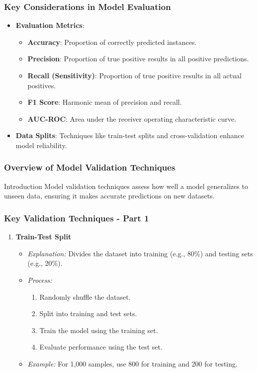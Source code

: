 \documentclass[aspectratio=169]{beamer}
\begin{document}
\begin{frame}[fragile]
    \frametitle{Key Considerations in Model Evaluation}
    \begin{itemize}
        \item \textbf{Evaluation Metrics}:
            \begin{itemize}
                \item \textbf{Accuracy}: Proportion of correctly predicted instances.
                \item \textbf{Precision}: Proportion of true positive results in all positive predictions.
                \item \textbf{Recall (Sensitivity)}: Proportion of true positive results in all actual positives.
                \item \textbf{F1 Score}: Harmonic mean of precision and recall.
                \item \textbf{AUC-ROC}: Area under the receiver operating characteristic curve.
            \end{itemize}
        \item \textbf{Data Splits}: Techniques like train-test splits and cross-validation enhance model reliability.
    \end{itemize}
\end{frame}

\begin{frame}[fragile]
    \frametitle{Overview of Model Validation Techniques}
    \begin{block}{Introduction}
        Model validation techniques assess how well a model generalizes to unseen data, ensuring it makes accurate predictions on new datasets.
    \end{block}
\end{frame}

\begin{frame}[fragile]
    \frametitle{Key Validation Techniques - Part 1}
    \begin{enumerate}
        \item \textbf{Train-Test Split}
        \begin{itemize}
            \item \textit{Explanation:} Divides the dataset into training (e.g., 80\%) and testing sets (e.g., 20\%).
            \item \textit{Process:}
            \begin{enumerate}
                \item Randomly shuffle the dataset.
                \item Split into training and test sets.
                \item Train the model using the training set.
                \item Evaluate performance using the test set.
            \end{enumerate}
            \item \textit{Example:} For 1,000 samples, use 800 for training and 200 for testing.
        \end{itemize}
    \end{enumerate}
\end{frame}
\end{document}
